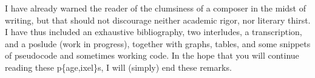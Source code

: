 I have already warned the reader of the clumsiness of a composer in the midst of writing, but that should not discourage neither academic rigor, nor literary thirst. I have thus included an exhaustive bibliography, two interludes, a transcription, and a poslude (work in progress), together with graphs, tables, and some snippets of pseudocode and sometimes working code. In the hope that you will continue reading these p\{age,ixel\}s, I will (simply)  end  these remarks.
